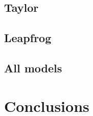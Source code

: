 \documentclass[11pt]{article} %
\begin{document}
\subsection{Taylor}
\label{sec:res:taylor}

\subsection{Leapfrog}
\label{sec:res:leapfrog}

\subsection{All models}
\label{sec:res:all}

\section{Conclusions}
\label{sec:conclusion}


\end{document}
